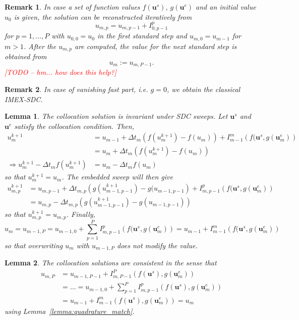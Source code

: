 \documentclass{article}
\newtheorem{remark}{Remark}
\newtheorem{lemma}{Lemma}
\newcommand{\ve}[1]{\mathbf{#1}}
\newcommand{\todo}[1]{\textcolor{red}{[TODO -- #1]}}
\begin{document}
%
%
%
\begin{remark}
In case a set of function values $f(\ve{u}^{s})$, $g(\ve{u}^e)$ and an initial value $u_0$ is given, the solution can be reconstructed iteratively from
\begin{equation}
	u_{m,p} = u_{m,p-1} + I_{0,p-1}^{p}
\end{equation}
for $p=1, \ldots, P$ with $u_{0,0} = u_0$ in the first standard step and $u_{m,0} = u_{m-1}$ for $m > 1$.
After the $u_{m,p}$ are computed, the value for the next standard step is obtained from
\begin{equation}
	u_{m} := u_{m,P-1}.
\end{equation}
\todo{hm... how does this help?}
\end{remark}
%
%
%
\begin{remark}
 In case of vanishing fast part, i.e. $g=0$, we obtain the classical IMEX-SDC.
\end{remark}
%
%
%
\begin{lemma}
The collocation solution is invariant under SDC sweeps. Let $\ve{u}^s$ and $\ve{u}^e$ satisfy the collocation condition.
Then,
\begin{align*}
	u^{k+1}_{m} &= u_{m-1}  + \Delta t_m \left( f(u^{k+1}_m) - f(u_m) \right) + I_{m-1}^{m}\left( f(\ve{u}^s, g(\ve{u}^e_m) \right) \\
		&= u_{m} + \Delta t_{m} \left( f(u^{k+1}_m) - f(u_m) \right) \\
	\Rightarrow u^{k+1}_m - \Delta t_m f(u^{k+1}_{m}) &= u_{m} - \Delta t_{m} f(u_m)
\end{align*}
so that $u^{k+1}_m = u_m$.
The embedded sweep will then give
\begin{align*}
	u^{k+1}_{m,p} &= u_{m,p-1} + \Delta t_{m,p} \left( g(u^{k+1}_{m-1,p-1}) - g(u_{m-1,p-1} \right) + I_{m,p-1}^{p} \left( f(\ve{u}^s, g(\ve{u}^e_m) \right) \\
				&= u_{m,p} - \Delta t_{m,p} \left( g(u^{k+1}_{m-1,p-1}) - g(u_{m-1,p-1}) \right)
\end{align*}
so that $u^{k+1}_{m,p} = u_{m,p}$.
Finally,
\begin{equation}
	u_{m} = u_{m-1,P} = u_{m-1,0} + \sum_{p=1}^{P} I_{m,p-1}^{p}\left( f(\ve{u}^s, g(\ve{u}^e_m) \right) = u_{m-1} + I_{m-1}^{m}\left( f(\ve{u}^s, g(\ve{u}^e_m) \right) 
\end{equation}
so that overwriting $u_{m}$ with $u_{m-1,P}$ does not modify the value.
\end{lemma}
%
%
%
\begin{lemma}
The collocation solutions are consistent in the sense that
\begin{align*}
	u_{m,P} &= u_{m-1,P-1} + I_{m,P-1}^{P}\left( f(\ve{u}^{s}) , g(\ve{u}^{e}_m) \right) \\
			&= \ldots = u_{m-1,0} + \sum_{p=1}^{P} I_{m,p-1}^{p}\left( f(\ve{u}^{s}) , g(\ve{u}^{e}_m) \right) \\
			&= u_{m-1} + I_{m-1}^{m}\left( f(\ve{u}^{s}) , g(\ve{u}^{e}_m) \right) = u_{m}
\end{align*}
using Lemma~\ref{lemma:quadrature_match}.
\end{lemma}
\end{document}
